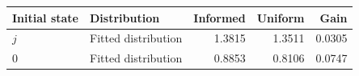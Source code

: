 \begin{tabular}{llrrr}\toprule
Initial state & Distribution & Informed & Uniform & Gain\\\midrule
$j$ & Fitted distribution & 1.3815 & 1.3511 & 0.0305 \\
$0$ & Fitted distribution & 0.8853 & 0.8106 & 0.0747 \\
\bottomrule\end{tabular}
